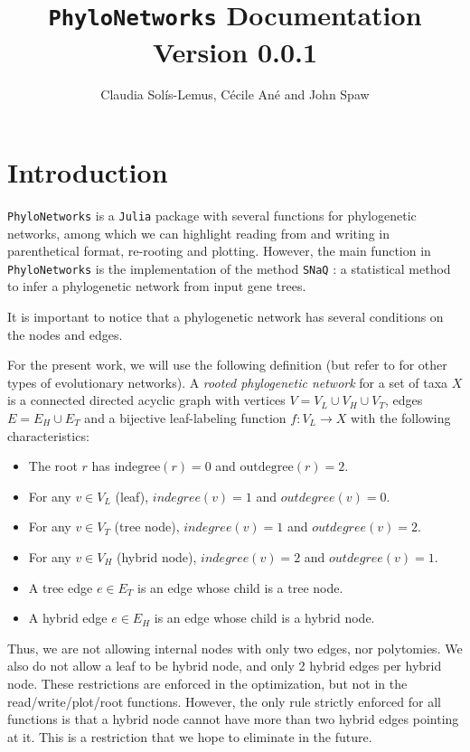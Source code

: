 \documentclass[12pt]{article}
\title{\texttt{PhyloNetworks} Documentation\\
 \large Version 0.0.1}
\author{Claudia Sol\'{i}s-Lemus, C\'{e}cile An\'{e} and John Spaw}
\begin{document}

\maketitle

\section{Introduction}
\texttt{PhyloNetworks} is a \texttt{Julia} package with several functions for
phylogenetic networks, among which we can highlight reading from and
writing in parenthetical format, re-rooting and plotting.
However, the main function in \texttt{PhyloNetworks} is the implementation of
the method \texttt{SNaQ} \citep{Solis-Lemus2015}: a statistical method to
infer a phylogenetic network from input gene trees.

It is important to notice that a phylogenetic network has several
conditions on the nodes and edges.

For the present work, we will use the following definition (but refer
to \citet{Huson2010} for other types of evolutionary networks).
A \textit{rooted phylogenetic network} for a set of taxa $X$ is a
connected directed acyclic graph with vertices $V=V_L \cup V_H \cup
V_T$, edges $E=E_H \cup E_T$ and a bijective leaf-labeling function
$f:V_L \rightarrow X$ with the following characteristics:
\begin{itemize}
\item The root $r$ has $\mathrm{indegree}(r)=0$ and $\mathrm{outdegree}(r)=2$.
\item{For any $v \in V_L$ (leaf), $indegree(v)=1$ and
    $outdegree(v)=0$.}
\item{For any $v \in V_T$ (tree node), $indegree(v)=1$ and $outdegree(v)=2$.}
\item{For any $v \in V_H$ (hybrid node), $indegree(v)=2$ and $outdegree(v)=1$.}
\item{A tree edge $e \in E_T$ is an edge whose child is a tree node.}
\item{A hybrid edge $e \in E_H$ is an edge whose child is a hybrid node.}
\end{itemize}
Thus, we are not allowing internal nodes with only two edges, nor
polytomies. We also do not allow a leaf to be hybrid node, and only 2
hybrid edges per hybrid node.  These restrictions are enforced in the
optimization, but not in the read/write/plot/root functions. However,
the only rule strictly enforced for all functions is that a hybrid
node cannot have more than two hybrid edges pointing at it. This is a
restriction that we hope to eliminate in the future.
\end{document}
